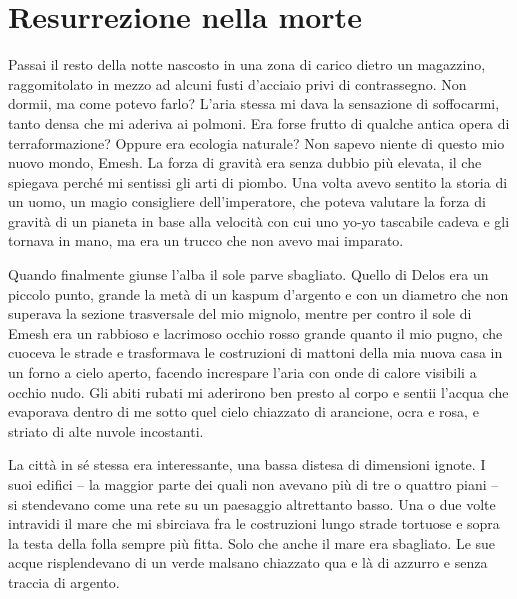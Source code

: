 \chapter{Resurrezione nella morte}

Passai il resto della notte nascosto in una zona di carico dietro un
magazzino, raggomitolato in mezzo ad alcuni fusti d'acciaio privi di
contrassegno. Non dormii, ma come potevo farlo? L'aria stessa mi dava la
sensazione di soffocarmi, tanto densa che mi aderiva ai polmoni. Era
forse frutto di qualche antica opera di terraformazione? Oppure era
ecologia naturale? Non sapevo niente di questo mio nuovo mondo, Emesh.
La forza di gravità era senza dubbio più elevata, il che spiegava perché
mi sentissi gli arti di piombo. Una volta avevo sentito la storia di un
uomo, un magio consigliere dell'imperatore, che poteva valutare la forza
di gravità di un pianeta in base alla velocità con cui uno yo-yo
tascabile cadeva e gli tornava in mano, ma era un trucco che non avevo
mai imparato.

Quando finalmente giunse l'alba il sole parve sbagliato. Quello di Delos
era un piccolo punto, grande la metà di un kaspum d'argento e con un
diametro che non superava la sezione trasversale del mio mignolo, mentre
per contro il sole di Emesh era un rabbioso e lacrimoso occhio rosso
grande quanto il mio pugno, che cuoceva le strade e trasformava le
costruzioni di mattoni della mia nuova casa in un forno a cielo aperto,
facendo increspare l'aria con onde di calore visibili a occhio nudo. Gli
abiti rubati mi aderirono ben presto al corpo e sentii l'acqua che
evaporava dentro di me sotto quel cielo chiazzato di arancione, ocra e
rosa, e striato di alte nuvole incostanti.

La città in sé stessa era interessante, una bassa distesa di dimensioni
ignote. I suoi edifici -- la maggior parte dei quali non avevano più di
tre o quattro piani -- si stendevano come una rete su un paesaggio
altrettanto basso. Una o due volte intravidi il mare che mi sbirciava
fra le costruzioni lungo strade tortuose e sopra la testa della folla
sempre più fitta. Solo che anche il mare era sbagliato. Le sue acque
risplendevano di un verde malsano chiazzato qua e là di azzurro e senza
traccia di argento.

